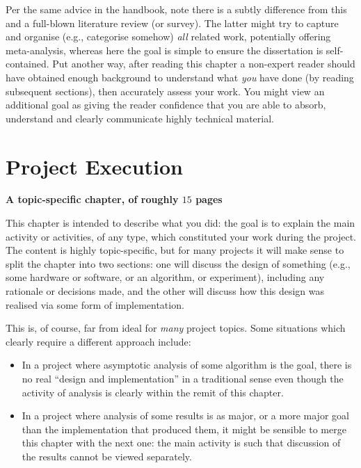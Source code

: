 \documentclass[ %
                    author={Gavin Parker},
                supervisor={Dr. Neill Campbell},
                    degree={MEng},
                     title={Deep Siamese Networks for Illumination Estimation from Stereo Images},
                  subtitle={},
                      type={research},
                      year={2018} ]{dissertation}
\begin{document}
Per the same advice in the handbook, note there is a subtly difference from
this and a full-blown literature review (or survey).  The latter might try
to capture and organise (e.g., categorise somehow) {\em all} related work,
potentially offering meta-analysis, whereas here the goal is simple to
ensure the dissertation is self-contained.  Put another way, after reading 
this chapter a non-expert reader should have obtained enough background to 
understand what {\em you} have done (by reading subsequent sections), then 
accurately assess your work.  You might view an additional goal as giving 
the reader confidence that you are able to absorb, understand and clearly 
communicate highly technical material.


\chapter{Project Execution}
\label{chap:execution}

{\bf A topic-specific chapter, of roughly $15$ pages} 
\vspace{1cm} 

\noindent
This chapter is intended to describe what you did: the goal is to explain
the main activity or activities, of any type, which constituted your work 
during the project.  The content is highly topic-specific, but for many 
projects it will make sense to split the chapter into two sections: one 
will discuss the design of something (e.g., some hardware or software, or 
an algorithm, or experiment), including any rationale or decisions made, 
and the other will discuss how this design was realised via some form of 
implementation.  

This is, of course, far from ideal for {\em many} project topics.  Some
situations which clearly require a different approach include:

\begin{itemize}
\item In a project where asymptotic analysis of some algorithm is the goal,
      there is no real ``design and implementation'' in a traditional sense
      even though the activity of analysis is clearly within the remit of
      this chapter.
\item In a project where analysis of some results is as major, or a more
      major goal than the implementation that produced them, it might be
      sensible to merge this chapter with the next one: the main activity 
      is such that discussion of the results cannot be viewed separately.
\end{itemize}
\end{document}
